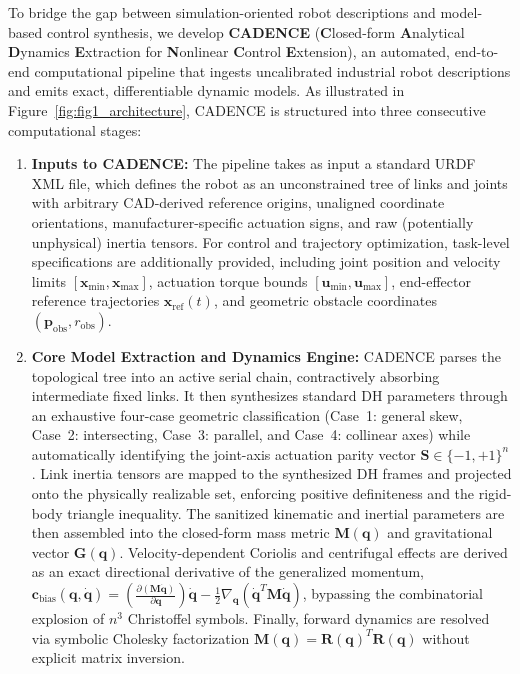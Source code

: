 \documentclass[fleqn,10pt]{article}
\begin{document}
To bridge the gap between simulation-oriented robot descriptions and model-based control synthesis, we develop \textbf{CADENCE} (\textbf{C}losed-form \textbf{A}nalytical \textbf{D}ynamics \textbf{E}xtraction for \textbf{N}onlinear \textbf{C}ontrol \textbf{E}xtension), an automated, end-to-end computational pipeline that ingests uncalibrated industrial robot descriptions and emits exact, differentiable dynamic models. As illustrated in Figure~\ref{fig:fig1_architecture}, CADENCE is structured into three consecutive computational stages:
\begin{enumerate}
	\item \textbf{Inputs to CADENCE:} The pipeline takes as input a standard URDF XML file, which defines the robot as an unconstrained tree of links and joints with arbitrary CAD-derived reference origins, unaligned coordinate orientations, manufacturer-specific actuation signs, and raw (potentially unphysical) inertia tensors. For control and trajectory optimization, task-level specifications are additionally provided, including joint position and velocity limits $[\bm{x}_{\min}, \bm{x}_{\max}]$, actuation torque bounds $[\bm{u}_{\min}, \bm{u}_{\max}]$, end-effector reference trajectories $\bm{x}_{\text{ref}}(t)$, and geometric obstacle coordinates $(\bm{p}_{\text{obs}}, r_{\text{obs}})$.
	\item \textbf{Core Model Extraction and Dynamics Engine:} CADENCE parses the topological tree into an active serial chain, contractively absorbing intermediate fixed links. It then synthesizes standard DH parameters through an exhaustive four-case geometric classification (Case~1: general skew, Case~2: intersecting, Case~3: parallel, and Case~4: collinear axes) while automatically identifying the joint-axis actuation parity vector $\bm{S} \in \{-1, +1\}^n$. Link inertia tensors are mapped to the synthesized DH frames and projected onto the physically realizable set, enforcing positive definiteness and the rigid-body triangle inequality. The sanitized kinematic and inertial parameters are then assembled into the closed-form mass metric $\bm{M}(\bm{q})$ and gravitational vector $\bm{G}(\bm{q})$. Velocity-dependent Coriolis and centrifugal effects are derived as an exact directional derivative of the generalized momentum, $\bm{c}_{\mathrm{bias}}(\bm{q},\dot{\bm{q}}) = \left(\frac{\partial (\bm{M}\dot{\bm{q}})}{\partial \bm{q}}\right)\dot{\bm{q}} - \frac{1}{2}\nabla_{\bm{q}}(\dot{\bm{q}}^T\bm{M}\dot{\bm{q}})$, bypassing the combinatorial explosion of $n^3$ Christoffel symbols. Finally, forward dynamics are resolved via symbolic Cholesky factorization $\bm{M}(\bm{q}) = \bm{R}(\bm{q})^T\bm{R}(\bm{q})$ without explicit matrix inversion.

\end{enumerate}
\end{document}

